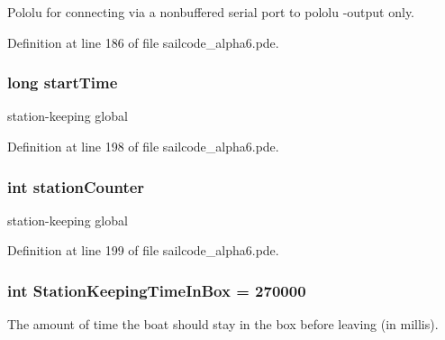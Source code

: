 \-Pololu for connecting via a nonbuffered serial port to pololu -\/output only. 



\-Definition at line 186 of file sailcode\-\_\-alpha6.\-pde.

\hypertarget{group__group1_ga8ad49a66e91d8658c5f1f7dbcbcbbd2f}{
\subsubsection[{start\-Time}]{\setlength{\rightskip}{0pt plus 5cm}long {\bf start\-Time}}}
\label{group__group1_ga8ad49a66e91d8658c5f1f7dbcbcbbd2f}


station-\/keeping global 



\-Definition at line 198 of file sailcode\-\_\-alpha6.\-pde.

\hypertarget{group__group1_gaffc96d075c8796c3d5ef3dc5824c0819}{
\subsubsection[{station\-Counter}]{\setlength{\rightskip}{0pt plus 5cm}int {\bf station\-Counter}}}
\label{group__group1_gaffc96d075c8796c3d5ef3dc5824c0819}


station-\/keeping global 



\-Definition at line 199 of file sailcode\-\_\-alpha6.\-pde.

\hypertarget{group__group1_gabe157ddfb46568e2de8b041f54ac6d98}{
\subsubsection[{\-Station\-Keeping\-Time\-In\-Box}]{\setlength{\rightskip}{0pt plus 5cm}int {\bf \-Station\-Keeping\-Time\-In\-Box} = 270000}}
\label{group__group1_gabe157ddfb46568e2de8b041f54ac6d98}


\-The amount of time the boat should stay in the box before leaving (in millis). 

